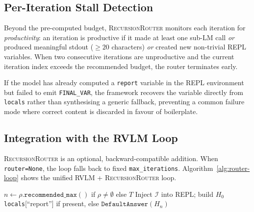 \documentclass{article}
\newcommand{\RVLM}{\textsc{Rvlm}}
\newcommand{\RRouter}{\textsc{RecursionRouter}}
\begin{document}
	\subsection{Per-Iteration Stall Detection}
	
	Beyond the pre-computed budget, \RRouter{} monitors each iteration for
	\emph{productivity}: an iteration is productive if it made at least one
	sub-LM call \emph{or} produced meaningful stdout ($\ge 20$ characters)
	\emph{or} created new non-trivial REPL variables.
	When two consecutive iterations are unproductive and the current iteration
	index exceeds the recommended budget, the router terminates early.
	
	If the model has already computed a \texttt{report} variable in the REPL
	environment but failed to emit \texttt{FINAL\_VAR}, the framework recovers
	the variable directly from \texttt{locals} rather than synthesising a generic
	fallback, preventing a common failure mode where correct content is
	discarded in favour of boilerplate.
	
	\subsection{Integration with the RVLM Loop}
	
	\RRouter{} is an optional, backward-compatible addition.
	When \texttt{router=None}, the loop falls back to fixed
	\texttt{max\_iterations}.
	Algorithm~\ref{alg:router-loop} shows the unified RVLM + \RRouter{} loop.
	
	\begin{algorithm}[h]
		\caption{\RVLM{} Completion Loop with \RRouter{}}
		\label{alg:router-loop}
		$n \gets \rho.\texttt{recommended\_max}()$ if $\rho \neq \emptyset$ else $T$\;
		Inject $\mathcal{I}$ into REPL; build $H_0$\;
		\Return \texttt{locals}[``report''] if present, else $\texttt{DefaultAnswer}(H_n)$\;
	\end{algorithm}
	
\end{document}
